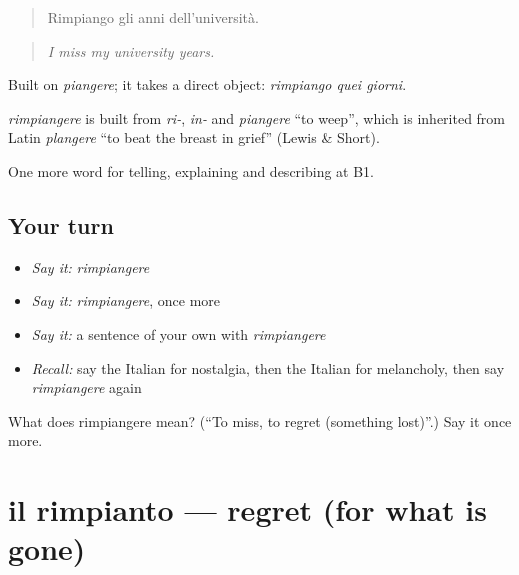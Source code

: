 \begin{quote}
Rimpiango gli anni dell'università.
\end{quote}

\begin{quote}
\emph{I miss my university years.}
\end{quote}

Built on \emph{piangere}; it takes a direct object: \emph{rimpiango quei giorni}.

\begin{cousinweb}
\emph{rimpiangere} is built from \emph{ri-}, \emph{in-} and \emph{piangere} \textquotedblleft{}to weep\textquotedblright{}, which is inherited from Latin \emph{plangere} \textquotedblleft{}to beat the breast in grief\textquotedblright{} (Lewis \& Short).
\end{cousinweb}

\begin{grammarlens}[title={What you've built}]
One more word for telling, explaining and describing at B1.
\end{grammarlens}

\subsection*{Your turn}
\begin{itemize}
\raggedright
  \item \emph{Say it:} \emph{rimpiangere}
  \item \emph{Say it:} \emph{rimpiangere}, once more
  \item \emph{Say it:} a sentence of your own with \emph{rimpiangere}
  \item \emph{Recall:} say the Italian for nostalgia, then the Italian for melancholy, then say \emph{rimpiangere} again
\end{itemize}

\begin{tcolorbox}[breakable,colback=teal!4,colframe=teal!35!black,title={Before you move on}]
What does rimpiangere mean? (\textquotedblleft{}To miss, to regret (something lost)\textquotedblright{}.) Say it once more.
\end{tcolorbox}
\section[il rimpianto]{il rimpianto — regret (for what is gone)}

\label{lesson:IT-C477-rimpianto}



